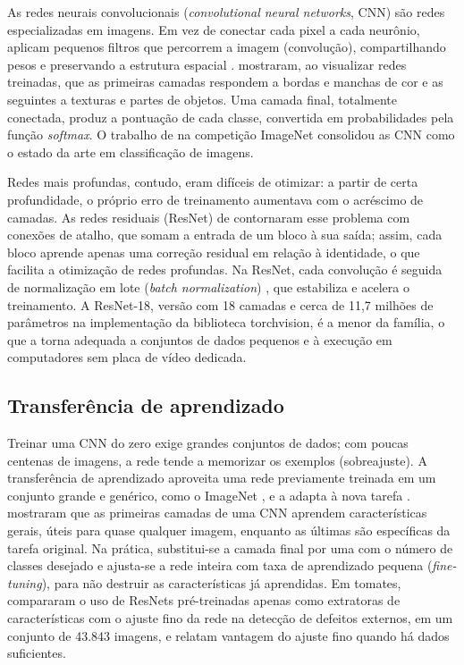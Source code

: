 As redes neurais convolucionais (\textit{convolutional neural networks}, CNN) são redes especializadas em imagens. Em vez de conectar cada pixel a cada neurônio, aplicam pequenos filtros que percorrem a imagem (convolução), compartilhando pesos e preservando a estrutura espacial \cite{lecun2015,goodfellow2016}. \textcite{zeiler2014} mostraram, ao visualizar redes treinadas, que as primeiras camadas respondem a bordas e manchas de cor e as seguintes a texturas e partes de objetos. Uma camada final, totalmente conectada, produz a pontuação de cada classe, convertida em probabilidades pela função \textit{softmax}. O trabalho de \textcite{krizhevsky2012} na competição ImageNet consolidou as CNN como o estado da arte em classificação de imagens.

Redes mais profundas, contudo, eram difíceis de otimizar: a partir de certa profundidade, o próprio erro de treinamento aumentava com o acréscimo de camadas. As redes residuais (ResNet) de \textcite{he2016} contornaram esse problema com conexões de atalho, que somam a entrada de um bloco à sua saída; assim, cada bloco aprende apenas uma correção residual em relação à identidade, o que facilita a otimização de redes profundas. Na ResNet, cada convolução é seguida de normalização em lote (\textit{batch normalization}) \cite{ioffe2015}, que estabiliza e acelera o treinamento. A ResNet-18, versão com 18 camadas \cite{he2016} e cerca de 11,7 milhões de parâmetros na implementação da biblioteca torchvision, é a menor da família, o que a torna adequada a conjuntos de dados pequenos e à execução em computadores sem placa de vídeo dedicada.

\subsection{Transferência de aprendizado}

Treinar uma CNN do zero exige grandes conjuntos de dados; com poucas centenas de imagens, a rede tende a memorizar os exemplos (sobreajuste). A transferência de aprendizado aproveita uma rede previamente treinada em um conjunto grande e genérico, como o ImageNet \cite{deng2009}, e a adapta à nova tarefa \cite{pan2010}. \textcite{yosinski2014} mostraram que as primeiras camadas de uma CNN aprendem características gerais, úteis para quase qualquer imagem, enquanto as últimas são específicas da tarefa original. Na prática, substitui-se a camada final por uma com o número de classes desejado e ajusta-se a rede inteira com taxa de aprendizado pequena (\textit{fine-tuning}), para não destruir as características já aprendidas. Em tomates, \textcite{dacosta2020} compararam o uso de ResNets pré-treinadas apenas como extratoras de características com o ajuste fino da rede na detecção de defeitos externos, em um conjunto de 43.843 imagens, e relatam vantagem do ajuste fino quando há dados suficientes.

